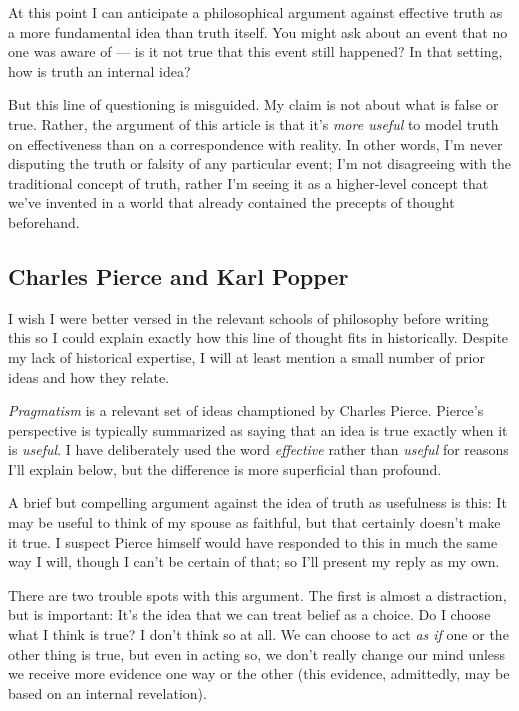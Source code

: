 \documentclass[20pt,]{extarticle}
\begin{document}
At this point I can anticipate a philosophical argument against
effective truth as a more fundamental idea than truth itself. You might
ask about an event that no one was aware of --- is it not true that this
event still happened? In that setting, how is truth an internal idea?

But this line of questioning is misguided. My claim is not about what is
false or true. Rather, the argument of this article is that it's
\emph{more useful} to model truth on effectiveness than on a
correspondence with reality. In other words, I'm never disputing the
truth or falsity of any particular event; I'm not disagreeing with the
traditional concept of truth, rather I'm seeing it as a higher-level
concept that we've invented in a world that already contained the
precepts of thought beforehand.

\subsection{Charles Pierce and Karl
Popper}\label{charles-pierce-and-karl-popper}

I wish I were better versed in the relevant schools of philosophy before
writing this so I could explain exactly how this line of thought fits in
historically. Despite my lack of historical expertise, I will at least
mention a small number of prior ideas and how they relate.

\emph{Pragmatism} is a relevant set of ideas champtioned by Charles
Pierce. Pierce's perspective is typically summarized as saying that an
idea is true exactly when it is \emph{useful}. I have deliberately used
the word \emph{effective} rather than \emph{useful} for reasons I'll
explain below, but the difference is more superficial than profound.

A brief but compelling argument against the idea of truth as usefulness
is this: It may be useful to think of my spouse as faithful, but that
certainly doesn't make it true. I suspect Pierce himself would have
responded to this in much the same way I will, though I can't be certain
of that; so I'll present my reply as my own.

There are two trouble spots with this argument. The first is almost a
distraction, but is important: It's the idea that we can treat belief as
a choice. Do I choose what I think is true? I don't think so at all. We
can choose to act \emph{as if} one or the other thing is true, but even
in acting so, we don't really change our mind unless we receive more
evidence one way or the other (this evidence, admittedly, may be based
on an internal revelation).
\end{document}

